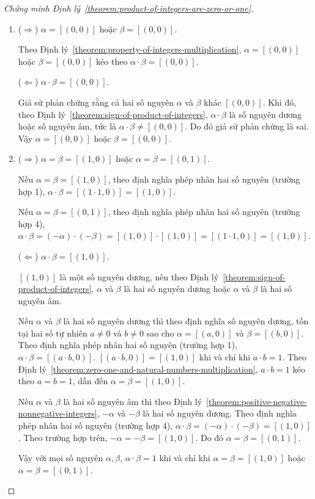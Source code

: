 \begin{proof}[Chứng minh Định lý~\ref{theorem:product-of-integers-are-zero-or-one}]
    \begin{enumerate}[label={(\roman*)}]
        \item ($\Rightarrow$) $\alpha = [(0,0)]$ hoặc $\beta = [(0,0)]$.

              Theo Định lý~\ref{theorem:property-of-integers-multiplication}, $\alpha = [(0,0)]$ hoặc $\beta = [(0,0)]$ kéo theo $\alpha\cdot\beta = [(0,0)]$.

              ($\Leftarrow$) $\alpha\cdot\beta = [(0,0)]$.

              Giả sử phản chứng rằng cả hai số nguyên $\alpha$ và $\beta$ khác $[(0,0)]$. Khi đó, theo Định lý~\ref{theorem:sign-of-product-of-integers}, $\alpha\cdot\beta$ là số nguyên dương hoặc số nguyên âm, tức là $\alpha\cdot\beta \ne [(0,0)]$. Do đó giả sử phản chứng là sai. Vậy $\alpha = [(0,0)]$ hoặc $\beta = [(0,0)]$.
        \item ($\Rightarrow$) $\alpha = \beta = [(1, 0)]$ hoặc $\alpha = \beta = [(0,1)]$.

              Nếu $\alpha = \beta = [(1, 0)]$, theo định nghĩa phép nhân hai số nguyên (trường hợp 1), $\alpha\cdot\beta = [(1\cdot 1, 0)] = [(1, 0)]$.

              Nếu $\alpha = \beta = [(0, 1)]$, theo định nghĩa phép nhân hai số nguyên (trường hợp 4), $\alpha\cdot\beta = (-\alpha)\cdot(-\beta) = [(1,0)]\cdot [(1,0)] = [(1\cdot 1, 0)] = [(1, 0)]$.

              ($\Leftarrow$) $\alpha\cdot\beta = [(1,0)]$.

              $[(1,0)]$ là một số nguyên dương, nên theo Định lý~\ref{theorem:sign-of-product-of-integers}, $\alpha$ và $\beta$ là hai số nguyên dương hoặc $\alpha$ và $\beta$ là hai số nguyên âm.

              Nếu $\alpha$ và $\beta$ là hai số nguyên dương thì theo định nghĩa số nguyên dương, tồn tại hai số tự nhiên $a\ne 0$ và $b\ne 0$ sao cho $\alpha = [(a,0)]$ và $\beta = [(b,0)]$. Theo định nghĩa phép nhân hai số nguyên (trường hợp 1), $\alpha\cdot\beta = [(a\cdot b, 0)]$. $[(a\cdot b, 0)] = [(1, 0)]$ khi và chỉ khi $a\cdot b = 1$. Theo Định lý~\ref{theorem:zero-one-and-natural-numbers-multiplication}, $a\cdot b = 1$ kéo theo $a = b = 1$, dẫn đến $\alpha = \beta = [(1,0)]$.

              Nếu $\alpha$ và $\beta$ là hai số nguyên âm thì theo Định lý~\ref{theorem:positive-negative-nonnegative-integers}, $-\alpha$ và $-\beta$ là hai số nguyên dương. Theo định nghĩa phép nhân hai số nguyên (trường hợp 4), $\alpha\cdot\beta = (-\alpha)\cdot(-\beta) = [(1, 0)]$. Theo trường hợp trên, $-\alpha = -\beta = [(1, 0)]$. Do đó $\alpha = \beta = [(0, 1)]$.

              Vậy với mọi số nguyên $\alpha, \beta$, $\alpha\cdot\beta = 1$ khi và chỉ khi $\alpha = \beta = [(1, 0)]$ hoặc $\alpha = \beta = [(0,1)]$.
    \end{enumerate}
\end{proof}

